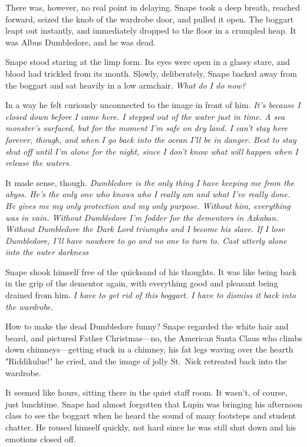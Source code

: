 There was, however, no real point in delaying. Snape took a deep breath, reached forward, seized the knob of the wardrobe door, and pulled it open. The boggart leapt out instantly, and immediately dropped to the floor in a crumpled heap. It was Albus Dumbledore, and he was dead.

Snape stood staring at the limp form. Its eyes were open in a glassy stare, and blood had trickled from its mouth. Slowly, deliberately, Snape backed away from the boggart and sat heavily in a low armchair. \emph{What do I do now?}

In a way he felt curiously unconnected to the image in front of him. \emph{It's because I closed down before I came here. I stepped out of the water just in time. A sea monster's surfaced, but for the moment I'm safe on dry land. I can't stay here forever, though, and when I go back into the ocean I'll be in danger. Best to stay shut off until I'm alone for the night, since I don't know what will happen when I release the waters.}

It made sense, though. \emph{Dumbledore is the only thing I have keeping me from the abyss. He's the only one who knows who I really am and what I've really done. He gives me my only protection and my only purpose. Without him, everything was in vain. Without Dumbledore I'm fodder for the dementors in Azkaban. Without Dumbledore the Dark Lord triumphs and I become his slave. If I lose Dumbledore, I'll have nowhere to go and no one to turn to. Cast utterly alone into the outer darkness{\el}}

Snape shook himself free of the quicksand of his thoughts. It was like being back in the grip of the dementor again, with everything good and pleasant being drained from him. \emph{I have to get rid of this boggart. I have to dismiss it back into the wardrobe.}

How to make the dead Dumbledore funny? Snape regarded the white hair and beard, and pictured Father Christmas—no, the American Santa Claus who climbs down chimneys—getting stuck in a chimney, his fat legs waving over the hearth{\el} "Riddikulus!" he cried, and the image of jolly St.~Nick retreated back into the wardrobe.

It seemed like hours, sitting there in the quiet staff room. It wasn't, of course, just lunchtime. Snape had almost forgotten that Lupin was bringing his afternoon class to see the boggart when he heard the sound of many footsteps and student chatter. He roused himself quickly, not hard since he was still shut down and his emotions closed off.

